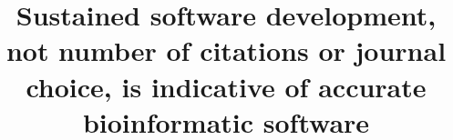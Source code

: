 \documentclass{bmcart}
\begin{document}
\begin{frontmatter}

\begin{fmbox}


\title{Sustained software development, not number of citations or journal choice, is indicative of accurate bioinformatic software}



\author[
  addressref={aff1,aff2},                   %
  corref={aff1},                       %
  email={paul.gardner@otago.ac.nz}   %
]{ }
\author[
  addressref={aff3},
  email={james.paterson@canterbury.ac.nz}
]{ }
\author[
  addressref={aff4},
  email={srm88@cam.ac.uk}
]{ }
\author[
  addressref={aff5},
  email={fatgho@food.dtu.dk}
]{ }
\author[
  addressref={aff6},
  email={sinan.ugur.umu@kreftregisteret.no}
]{ }
\author[
  addressref={aff7},
  email={PawlikA@landcareresearch.co.nz}
]{ }
\author[
  addressref={aff8},
  email={alex@biods.org}
]{ }
\author[
  addressref={aff1},
  email={mik.black@otago.ac.nz}
]{ }


\end{fmbox}
\end{frontmatter}
\end{document}
